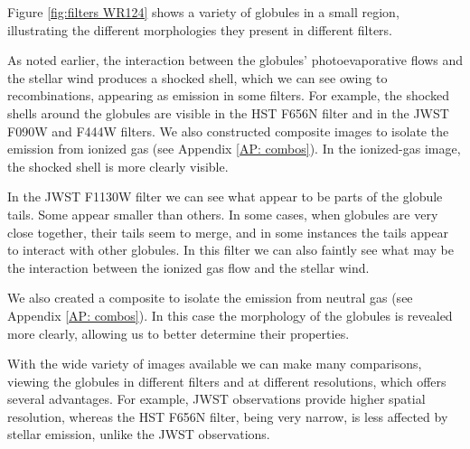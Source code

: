 \documentclass{book}
\begin{document}
Figure \ref{fig:filters WR124} shows a variety of globules in a small
region, illustrating the different morphologies they present in
different filters.

As noted earlier, the interaction between the globules’
photoevaporative flows and the stellar wind produces a shocked shell,
which we can see owing to recombinations, appearing as emission in
some filters. For example, the shocked shells around the globules are
visible in the HST F656N filter and in the JWST F090W and F444W
filters. We also constructed composite images to isolate the emission
from ionized gas (see Appendix \ref{AP: combos}). In the ionized-gas
image, the shocked shell is more clearly visible.

In the JWST F1130W filter we can see what appear to be parts of the
globule tails. Some appear smaller than others. In some cases, when
globules are very close together, their tails seem to merge, and in
some instances the tails appear to interact with other globules. In
this filter we can also faintly see what may be the interaction
between the ionized gas flow and the stellar wind.

We also created a composite to isolate the emission from neutral gas
(see Appendix \ref{AP: combos}). In this case the morphology of the
globules is revealed more clearly, allowing us to better determine
their properties.

With the wide variety of images available we can make many
comparisons, viewing the globules in different filters and at
different resolutions, which offers several advantages. For example,
JWST observations provide higher spatial resolution, whereas the HST
F656N filter, being very narrow, is less affected by stellar emission,
unlike the JWST observations.
\end{document}
